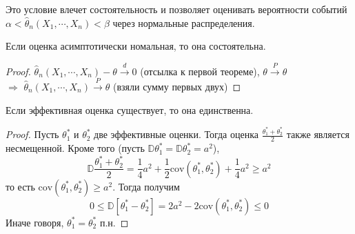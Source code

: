 \begin{enumerate}
\[\]
Это условие влечет состоятельность и позволяет оценивать вероятности событий \\ $\alpha < \widehat{\theta}_n\left(X_1, \cdots, X_n\right) < \beta$ через нормальные распределения.
\begin{advice}
Если оценка асимптотически номальная, то она состоятельна.
\end{advice}
\begin{proof}
 $\widehat{\theta}_n\left(X_1, \cdots, X_n\right) - \theta \xrightarrow{d} 0$ (отсылка к первой теореме), $\theta \xrightarrow{P} \theta$ \\ $\Rightarrow$ $\widehat{\theta}_n\left(X_1, \cdots, X_n\right) \xrightarrow{P} \theta$ (взяли сумму первых двух)
\end{proof}
\end{enumerate}
\begin{advice}
Если эффективная оценка существует, то она единственна.
\end{advice}
\begin{proof}
Пусть $\theta^*_1$ и $\theta^*_2$ две эффективные оценки. Тогда оценка $\frac{\theta^*_1 + \theta^*_2}{2}$ также является несмещенной. Кроме того (пусть $\mathbb{D} \theta^*_1 = \mathbb{D} \theta^*_2 = a ^ 2$),
\[
    \mathbb{D}\frac{\theta^*_1 + \theta^*_2}{2} = \frac 1 4 a ^ 2 + \frac 1 2 \text{cov}\left(\theta^*_1, \theta^*_2\right) + \frac 1 4 a ^ 2 \geq a ^ 2
\]
то есть $\text{cov}\left(\theta^*_1, \theta^*_2\right) \geq a ^ 2$. Тогда получим
\[
    0 \leq \mathbb{D}\left[\theta^*_1 - \theta^*_2\right] = 2 a ^ 2 - 2 \text{cov}\left(\theta^*_1, \theta^*_2\right) \leq 0
\]
Иначе говоря, $\theta^*_1 = \theta^*_2$ п.н.
\end{proof}

